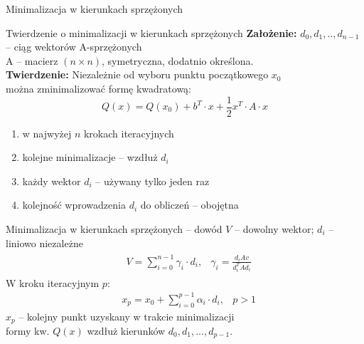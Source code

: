   \begin{frame}{Minimalizacja w kierunkach sprzężonych}
    \begin{block}{Twierdzenie o minimalizacji w kierunkach sprzężonych}
      \textbf{Założenie: } $d_0, d_1, .., d_{n - 1}$ -- ciąg wektorów A-sprzężonych\\
        A -- macierz $(n \times n)$, symetryczna, dodatnio określona.\\
      \textbf{Twierdzenie: } Niezależnie od wyboru punktu początkowego $x_0$\\
       można zminimalizować formę kwadratową:
       \begin{equation}\label{eq:tw_1}
         Q(x) = Q(x_0) + b^T \cdot x + \frac{1}{2} x^T \cdot A \cdot x
       \end{equation}
       \begin{enumerate}
         \item w najwyżej $n$ krokach iteracyjnych\\
         \item kolejne minimalizacje -- wzdłuż $d_i$\\
         \item każdy wektor $d_i$ -- używany tylko jeden raz\\
         \item kolejność wprowadzenia $d_i$ do obliczeń -- obojętna
       \end{enumerate}
    \end{block}
  \end{frame}

  \begin{frame}{Minimalizacja w kierunkach sprzężonych -- dowód}
    $V$ -- dowolny wektor; $d_i$ -- liniowo niezależne
    \begin{equation}
      \begin{gathered}
        \begin{aligned}
          &V = \sum_{i=0}^{n - 1} \gamma_i \cdot d_i, &\gamma_i = \frac{d_i A v}{d_i^T A d_i}
        \end{aligned}
      \end{gathered}
    \end{equation}
    W kroku iteracyjnym $p$:
    \begin{equation*}
        \begin{aligned}
          &x_p = x_0 + \sum_{i = 0}^{p - 1} \alpha_i \cdot d_i, &p > 1
        \end{aligned}
    \end{equation*}
    $x_p$ -- kolejny punkt uzyskany w trakcie minimalizacji\\
    formy kw. $Q(x)$ wzdłuż kierunków $d_0, d_1, ..., d_{p - 1}$.
  \end{frame}

